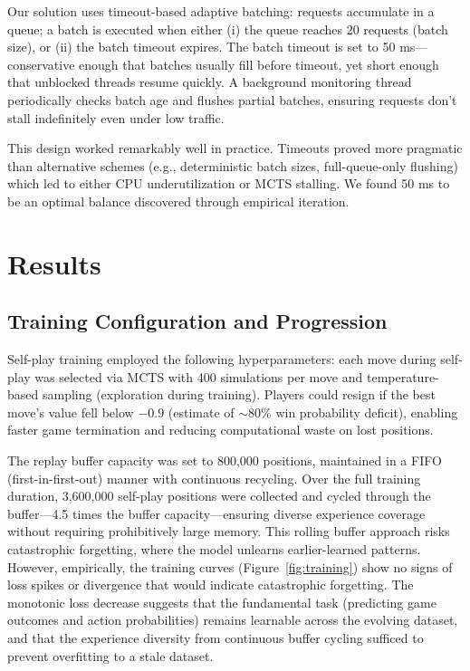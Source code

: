 \documentclass[12pt]{article}
\begin{document}
Our solution uses timeout-based adaptive batching: requests accumulate in a queue; a batch is executed when either (i) the queue reaches 20 requests (batch size), or (ii) the batch timeout expires. The batch timeout is set to 50 ms—conservative enough that batches usually fill before timeout, yet short enough that unblocked threads resume quickly. A background monitoring thread periodically checks batch age and flushes partial batches, ensuring requests don't stall indefinitely even under low traffic.

This design worked remarkably well in practice. Timeouts proved more pragmatic than alternative schemes (e.g., deterministic batch sizes, full-queue-only flushing) which led to either CPU underutilization or MCTS stalling. We found 50 ms to be an optimal balance discovered through empirical iteration.

\section{Results}

\subsection{Training Configuration and Progression}

Self-play training employed the following hyperparameters: each move during self-play was selected via MCTS with 400 simulations per move and temperature-based sampling (exploration during training). Players could resign if the best move's value fell below $-0.9$ (estimate of $\sim 80\%$ win probability deficit), enabling faster game termination and reducing computational waste on lost positions.

The replay buffer capacity was set to 800,000 positions, maintained in a FIFO (first-in-first-out) manner with continuous recycling. Over the full training duration, 3,600,000 self-play positions were collected and cycled through the buffer—4.5 times the buffer capacity—ensuring diverse experience coverage without requiring prohibitively large memory. This rolling buffer approach risks catastrophic forgetting, where the model unlearns earlier-learned patterns. However, empirically, the training curves (Figure~\ref{fig:training}) show no signs of loss spikes or divergence that would indicate catastrophic forgetting. The monotonic loss decrease suggests that the fundamental task (predicting game outcomes and action probabilities) remains learnable across the evolving dataset, and that the experience diversity from continuous buffer cycling sufficed to prevent overfitting to a stale dataset.
\end{document}

